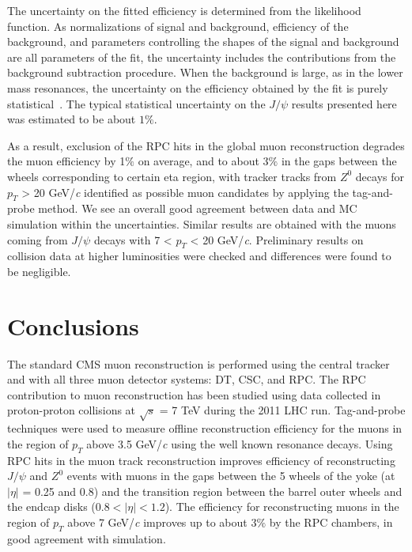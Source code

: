 \documentclass{JINST}
\begin{document}
The uncertainty on the fitted efficiency is determined from the likelihood function.
As normalizations of signal and background, efficiency of the background, and parameters controlling the shapes of the signal and background are all parameters of the fit, the uncertainty includes the contributions from the background subtraction procedure.
When the background is large, as in the lower mass resonances,
the uncertainty on the efficiency obtained by the fit is purely statistical~\cite{MUO-10-004}.
The typical statistical uncertainty on the $J/\psi$ results presented here
was estimated to be about $1\%$. %

As a result, exclusion of the RPC hits in the global muon reconstruction degrades the muon efficiency by 1$\%$ on average, and to about 3$\%$ in the gaps between the wheels corresponding to certain eta region,
with tracker tracks from $Z^{0}$ decays for $p_T$ > 20 GeV/\emph{c} identified as possible muon candidates by applying the tag-and-probe method.
We see an overall good agreement between data and MC simulation within the
uncertainties.
Similar results are obtained with the muons coming from $J/\psi$ decays with 7 < $p_T$ < 20 GeV/\emph{c}.
Preliminary results on collision data at higher luminosities were checked and differences were found to be negligible.

\section{Conclusions}

The standard CMS muon reconstruction is performed using the central tracker and with all three muon detector systems: DT, CSC, and RPC.
The RPC contribution to muon reconstruction has been studied using
data collected in proton-proton collisions at $\sqrt s$ = 7 TeV during the 2011 LHC run. Tag-and-probe techniques were used to measure offline reconstruction efficiency for the muons in the region of $p_T$ above 3.5 GeV/\emph{c} using the well known resonance decays.
Using RPC hits in the muon track reconstruction improves efficiency of reconstructing $J/\psi$ and $Z^{0}$ events with muons in the gaps between the 5 wheels of the yoke (at $|\eta|$ = 0.25 and 0.8) and the transition region between the barrel outer wheels and the endcap disks ($0.8<|\eta|<1.2$).
The efficiency for reconstructing muons in the region of $p_T$ above 7 GeV/\emph{c} improves up to about 3$\%$ by the RPC chambers, in good agreement with simulation.
\end{document}
